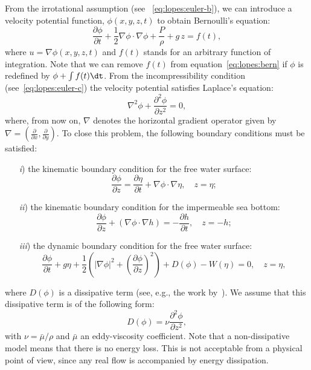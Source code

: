 From the irrotational assumption (see
~\eqref{eq:lopes:euler-b}), we can introduce a velocity
potential function, $\phi(x,y,z,t)$ to
obtain Bernoulli's equation:
\begin{equation}\label{eq:lopes:bern}
\frac{\partial \phi}{\partial t}+\frac{1}{2}\nabla \phi \cdot\nabla \phi
+\frac{P}{\rho} +g\, z=f(t),
\end{equation}
where $u=\nabla\phi(x,y,z,t)$ and $f(t)$ stands for an
arbitrary function of integration.  Note that we can remove
$f(t)$ from equation~\eqref{eq:lopes:bern} if $\phi$ is
redefined by $\phi+\int f(t) \dt$.  From the
incompressibility condition (see~\eqref{eq:lopes:euler-c})
the velocity potential satisfies Laplace's equation:
\begin{equation}\label{eq:lopes:lap}
\nabla^2\phi+\frac{\partial^2\phi}{\partial z^2}=0,
\end{equation}
where, from now on, $\nabla$ denotes the horizontal gradient
operator given by
$\nabla=\left(\frac{\partial }{\partial x},\frac{\partial
}{\partial y}\right)\!\!.$ To close
this problem, the following boundary conditions must be
satisfied:
\begin{enumerate}
\item[{\it i})] the kinematic boundary condition for the
  free water surface:
\begin{equation}
\frac{\partial \phi}{\partial
  z}=\frac{\partial\eta}{\partial t}+\nabla\phi\cdot\nabla\eta,\quad
z=\eta;
\end{equation}
\item[{\it ii})] the kinematic boundary condition for the
  impermeable sea bottom:
\begin{equation}
\frac{\partial \phi}{\partial z}+(\nabla\phi\cdot\nabla
h)=-\frac{\partial h}{\partial t}, \quad
z=-h ;
\end{equation}
\item[{\it iii})] the dynamic boundary condition for the
  free water surface:
\begin{equation}\label{eq:lopes:dyn}
\frac{\partial \phi}{\partial t}+ g\eta+\frac{1}{2} \left(|\nabla\phi|^2
+\left(\frac{\partial \phi}{\partial z}\right)^2\right)+ D(\phi)-W(\eta) = 0,
\quad z =\eta,
\end{equation}
\end{enumerate}
where $D(\phi)$ is a dissipative term (see, e.g., the work
by~\cite{DutykhDias2007}).  We assume that this dissipative
term is of the following form:
\begin{equation}\label{eq:lopes:diss}
 D(\phi)=\nu\frac{\partial ^2\phi}{\partial z^2},
\end{equation}
with $\nu=\bar{\mu}/\rho$ and $\bar{\mu}$ an eddy-viscosity
coefficient.  Note that a non-dissipative model means that
there is no energy loss.  This is not acceptable from a
physical point of view, since any real flow is accompanied
by energy dissipation.

